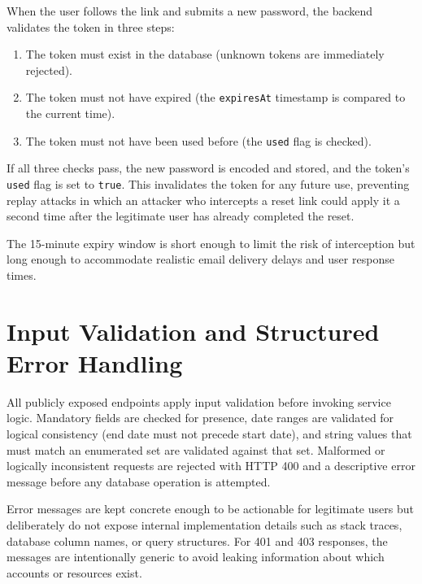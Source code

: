 \par When the user follows the link and submits a new password, the backend validates the token in three steps:

\begin{enumerate}
    \item The token must exist in the database (unknown tokens are immediately rejected).
    \item The token must not have expired (the \texttt{expiresAt} timestamp is compared to the current time).
    \item The token must not have been used before (the \texttt{used} flag is checked).
\end{enumerate}


\par If all three checks pass, the new password is encoded and stored, and the token's \texttt{used} flag is set to \texttt{true}. This invalidates the token for any future use, preventing replay attacks in which an attacker who intercepts a reset link could apply it a second time after the legitimate user has already completed the reset.

\par The 15-minute expiry window is short enough to limit the risk of interception but long enough to accommodate realistic email delivery delays and user response times.

\section{Input Validation and Structured Error Handling}
\par All publicly exposed endpoints apply input validation before invoking service logic. Mandatory fields are checked for presence, date ranges are validated for logical consistency (end date must not precede start date), and string values that must match an enumerated set are validated against that set. Malformed or logically inconsistent requests are rejected with HTTP 400 and a descriptive error message before any database operation is attempted.

\par Error messages are kept concrete enough to be actionable for legitimate users but deliberately do not expose internal implementation details such as stack traces, database column names, or query structures. For 401 and 403 responses, the messages are intentionally generic to avoid leaking information about which accounts or resources exist.

